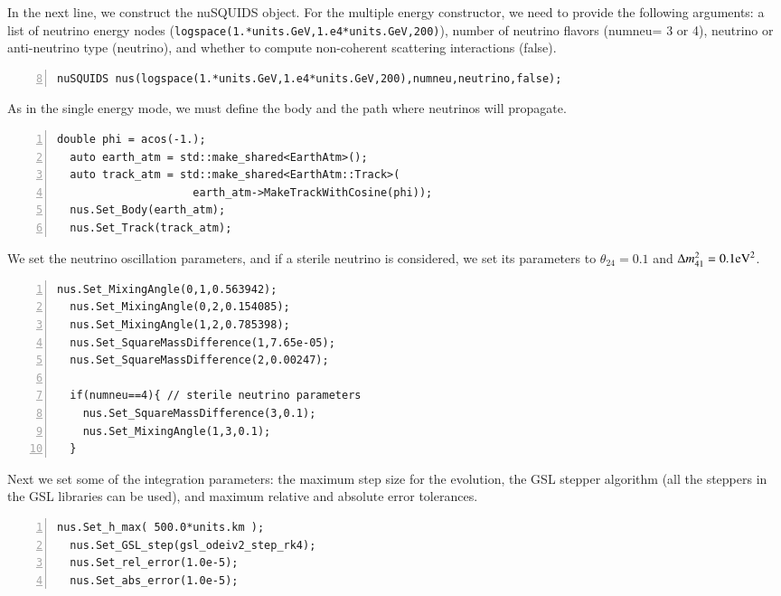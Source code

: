 \documentclass[3p,12pt]{elsarticle}
\newcommand{\ttf}{\ttfamily}
\begin{document}
In the next line, we construct the {\ttf nuSQUIDS} object. For the
multiple energy constructor, we need to provide the following arguments:
a list of neutrino energy nodes
(\lstinline[columns=fixed,breaklines=true]{logspace(1.*units.GeV,1.e4*units.GeV,200)}),
number of neutrino flavors ({\ttf numneu}= 3 or 4), neutrino or
anti-neutrino type ({\ttf neutrino}), and whether to compute non-coherent scattering
interactions ({\ttf false}). 
\begin{lstlisting}[frame=leftline, numbers = left,breaklines=true,
  label = ex:sin1,firstnumber=8]
  nuSQUIDS nus(logspace(1.*units.GeV,1.e4*units.GeV,200),numneu,neutrino,false);
\end{lstlisting}

As in the single energy mode, we must define the body and the path
where neutrinos will propagate.

\begin{lstlisting}[frame=leftline, numbers = left,breaklines=true,
  label = ex:sin1,firstnumber=last]
  double phi = acos(-1.);
  auto earth_atm = std::make_shared<EarthAtm>();
  auto track_atm = std::make_shared<EarthAtm::Track>(
                     earth_atm->MakeTrackWithCosine(phi));
  nus.Set_Body(earth_atm);
  nus.Set_Track(track_atm);
\end{lstlisting}

We set the neutrino oscillation parameters, and if a sterile
neutrino is considered, we set its parameters to $\theta_{24}=0.1$ and
$\Delta m_{41}^2=0.1{\rm eV}^2$.
\begin{lstlisting}[frame=leftline, numbers = left,breaklines=true,label = ex:sin1,firstnumber=last]
  nus.Set_MixingAngle(0,1,0.563942);
  nus.Set_MixingAngle(0,2,0.154085);
  nus.Set_MixingAngle(1,2,0.785398);
  nus.Set_SquareMassDifference(1,7.65e-05);
  nus.Set_SquareMassDifference(2,0.00247);

  if(numneu==4){ // sterile neutrino parameters
    nus.Set_SquareMassDifference(3,0.1);
    nus.Set_MixingAngle(1,3,0.1);
  }
\end{lstlisting}

Next we set some of the integration parameters: the maximum
step size for the evolution, the GSL stepper algorithm (all the steppers in
the GSL libraries can be used), and maximum relative and absolute error tolerances.

\begin{lstlisting}[frame=leftline, numbers = left,breaklines=true,label = ex:sin1,firstnumber=last]
  nus.Set_h_max( 500.0*units.km );
  nus.Set_GSL_step(gsl_odeiv2_step_rk4);
  nus.Set_rel_error(1.0e-5);
  nus.Set_abs_error(1.0e-5);
\end{lstlisting}
\end{document}
